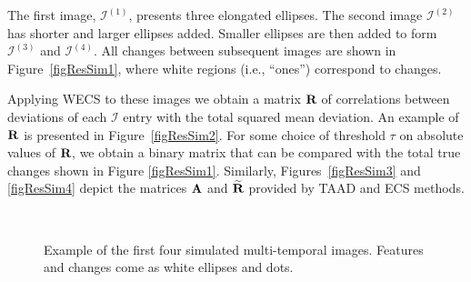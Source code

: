 \documentclass[journal]{IEEEtran}
\newcommand{\vA}{{\textbf A}}
\newcommand{\vR}{{\textbf R}}
\begin{document}
The first image, $\mathcal{I}^{(1)}$, presents three elongated ellipses. The second image $\mathcal{I}^{(2)}$ has shorter and larger ellipses added. Smaller ellipses are then added to form $\mathcal{I}^{(3)}$ and $\mathcal{I}^{(4)}$. All changes between subsequent images are shown in Figure~\ref{figResSim1}, where white regions (i.e., ``ones'') correspond to changes.

Applying WECS to these images we obtain a matrix $\vR$ of correlations between deviations of each $\mathcal{I}$ entry with the total squared mean deviation. An example of $\vR$ is presented in Figure~\ref{figResSim2}. For some choice of threshold $\tau$ on absolute values of $\vR$, we obtain a binary matrix that can be compared with the total true changes shown in Figure \ref{figResSim1}.
Similarly, Figures~\ref{figResSim3} and \ref{figResSim4} depict the matrices $\vA$ and $\widetilde{\vR}$ provided by TAAD and ECS methods.



\begin{figure}[hbt]
\centering

\mbox{
}
\mbox{
}

\caption{Example of the first four simulated multi-temporal images. Features and changes come as white ellipses and dots.}
\label{F:EllipsoidChanges}
\end{figure}
\end{document}
